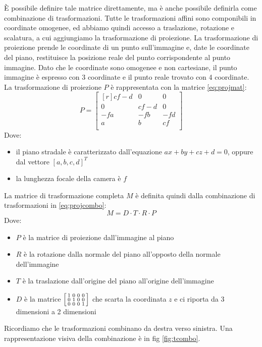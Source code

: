 È possibile definire tale matrice direttamente, ma è anche possibile definirla come combinazione di trasformazioni.
Tutte le trasformazioni affini sono componibili in coordinate omogenee, ed abbiamo quindi accesso a traslazione, rotazione e scalatura, a cui aggiungiamo la trasformazione di proiezione.
La trasformazione di proiezione prende le coordinate di un punto sull'immagine e, date le coordinate del piano, restituisce la posizione reale del punto corrispondente al punto immagine.
Dato che le coordinate sono omogenee e non cartesiane, il punto immagine è espresso con 3 coordinate e il punto reale trovato con 4 coordinate.
La trasformazione di proiezione $P$ è rappresentata con la matrice \ref{eq:projmat}:
\begin{equation}
        \label{eq:projmat}
        P = 
        \begin{bmatrix*}[r]
            cf - d & 0      & 0   \\
            0      & cf - d & 0   \\
            -fa    & -fb    & -fd \\
            a      & b      & cf  \\
        \end{bmatrix*}
\end{equation}
Dove:
\begin{itemize}
    \item il piano stradale è caratterizzato dall'equazione $ax + by + cz + d = 0$, oppure dal vettore $[a, b, c, d]^T$
    \item la lunghezza focale della camera è $f$
\end{itemize}

La matrice di trasformazione completa $M$ è definita quindi dalla combinazione di trasformazioni in \ref{eq:projcombo}:
\begin{equation}
    \label{eq:projcombo}
    M = D \cdot T \cdot R \cdot P
\end{equation}
Dove:
\begin{itemize}
    \item $P$ è la matrice di proiezione dall'immagine al piano
    \item $R$ è la rotazione dalla normale del piano all'opposto della normale dell'immagine
    \item $T$ è la traslazione dall'origine del piano all'origine dell'immagine
    \item $D$ è la matrice 
    $
    \begin{bsmallmatrix}
        1 & 0 & 0 & 0 \\
        0 & 1 & 0 & 0 \\
        0 & 0 & 0 & 1 \\
    \end{bsmallmatrix}
    $
    che scarta la coordinata $z$ e ci riporta da 3 dimensioni a 2 dimensioni
\end{itemize}
Ricordiamo che le trasformazioni combinano da destra verso sinistra.
Una rappresentazione visiva della combinazione è in fig \ref{fig:tcombo}.

